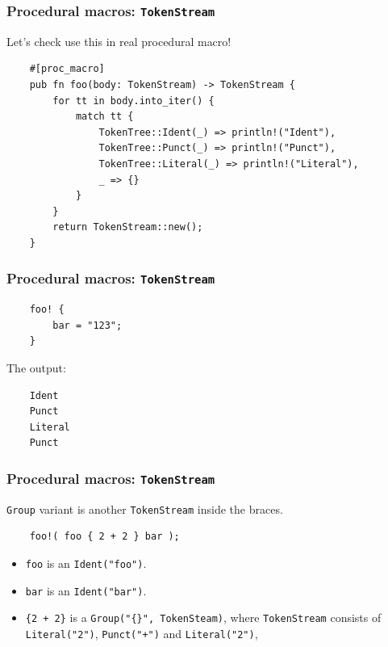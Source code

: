 \documentclass[aspectratio=1610,t]{beamer}
\begin{document}

\begin{frame}[fragile]
\frametitle{Procedural macros: \texttt{TokenStream}}
Let's check use this in real procedural macro!

\begin{verbatim}
    #[proc_macro]
    pub fn foo(body: TokenStream) -> TokenStream {
        for tt in body.into_iter() {
            match tt {
                TokenTree::Ident(_) => println!("Ident"),
                TokenTree::Punct(_) => println!("Punct"),
                TokenTree::Literal(_) => println!("Literal"),
                _ => {}
            }
        }
        return TokenStream::new();
    }
\end{verbatim}
\end{frame}


\begin{frame}[fragile]
\frametitle{Procedural macros: \texttt{TokenStream}}
\begin{verbatim}
    foo! {
        bar = "123";
    }
\end{verbatim}

The output:

\begin{verbatim}
    Ident
    Punct
    Literal
    Punct
\end{verbatim}
\end{frame}


\begin{frame}[fragile]
\frametitle{Procedural macros: \texttt{TokenStream}}
\texttt{Group} variant is another \texttt{TokenStream} inside the braces.

\begin{verbatim}
    foo!( foo { 2 + 2 } bar );
\end{verbatim}

\begin{itemize}
    \item<2-> \texttt{foo} is an \texttt{Ident("foo")}.
    \item<3-> \texttt{bar} is an \texttt{Ident("bar")}.
    \item<4-> \texttt{\{2 + 2\}} is a \texttt{Group("\{\}", TokenSteam)}, where \texttt{TokenStream} consists of \texttt{Literal("2")}, \texttt{Punct("+")} and \texttt{Literal("2")},
\end{itemize}
\end{frame}
\end{document}

